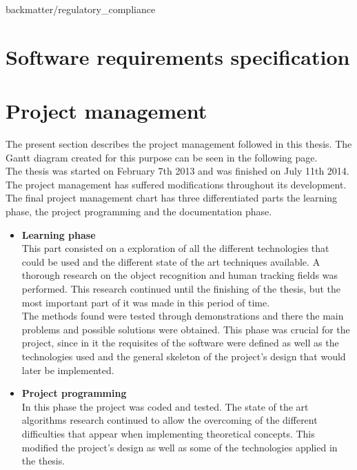 \begin{appendices}

	 {backmatter/regulatory_compliance}
	\chapter{Software requirements specification}
			


	\chapter{Project management}
	\label{project_management}
		 The present section describes the project management followed in this thesis. The Gantt diagram created for this purpose can be seen in the following page.
		 \\

		 The thesis was started on February 7th 2013 and was finished on July 11th 2014.    
		 The project management has suffered modifications throughout its development.  The final project management chart has three differentiated parts the learning phase, the project programming and the documentation phase. 
		 \begin{itemize}
			 	\item{\textbf{Learning phase}} \\
			 	This part consisted on a exploration of all the different technologies that could be used and the different state of the art techniques available. A thorough research on the object recognition and human tracking fields was performed. This research continued until the finishing of the thesis, but the most important part of it was made in this period of time. 
			 	\\

			 	The methods found were tested through demonstrations and there the main problems and possible solutions were obtained. This phase was crucial for the project, since in it the requisites of the software were defined as well as the technologies used and the general skeleton of the project's design that would later be implemented. 
			 	\\

			 	\item{\textbf{Project programming}}\\
			 	In this phase the project was coded and tested. The state of the art algorithms research continued to allow the overcoming of the different difficulties that appear when implementing theoretical concepts. This modified the project's design as well as some of the technologies applied in the thesis. 


\end{itemize}
\end{appendices}
